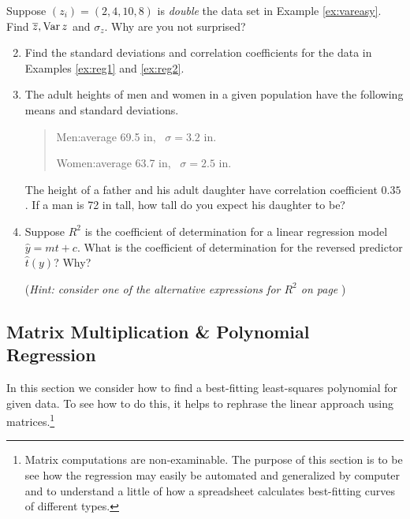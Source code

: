 \begin{exercises}{}{}
	\exstart Suppose $(z_i)=(2,4,10,8)$ is \emph{double} the data set in Example \ref{ex:vareasy}. Find $\overline{z},\operatorname{Var} z$ and $\sigma_z$. Why are you not surprised?
	
	\begin{enumerate}\setcounter{enumi}{1}
	  \item Find the standard deviations and correlation coefficients for the data in Examples \ref{ex:reg1} and \ref{ex:reg2}.
	  
	  
	  \item The adult heights of men and women in a given population have the following means and standard deviations.
	  \begin{quote}
	  	Men:\lstsp average 69.5 in, \ $\sigma=3.2$ in.\par
	  	Women:\lstsp average 63.7 in, \ $\sigma=2.5$ in.
	  \end{quote}
	  The height of a father and his adult daughter have correlation coefficient $0.35$. If a man is 72 in tall, how tall do you expect his daughter to be?
	
	  
	  \item Suppose $R^2$ is the coefficient of determination for a linear regression model $\hat y=mt+c$. What is the coefficient of determination for the reversed predictor $\hat t(y)$? Why?\par
	  (\emph{Hint: consider one of the alternative expressions for $R^2$ on page \pageref{pg:rsqalt}})
	\end{enumerate}

\end{exercises}

\clearpage



\subsection{Matrix Multiplication \& Polynomial Regression}

In this section we consider how to find a best-fitting least-squares polynomial for given data. To see how to do this, it helps to rephrase the linear approach using matrices.\footnote{Matrix computations are non-examinable. The purpose of this section is to be see how the regression may easily be automated and generalized by computer and to understand a little of how a spreadsheet calculates best-fitting curves of different types.}
\bigskip

